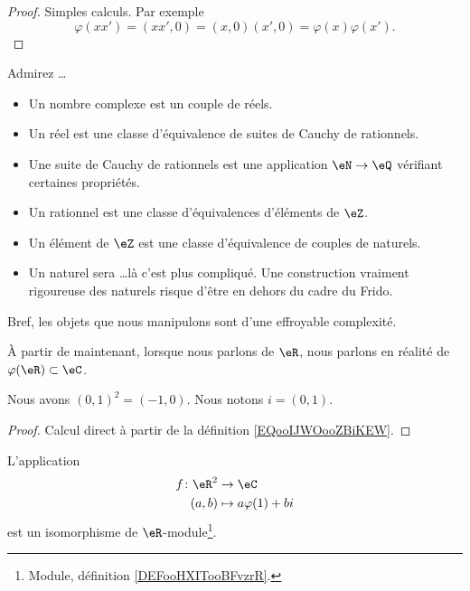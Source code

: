 \begin{proof}
	Simples calculs. Par exemple
	\begin{equation}
		\varphi(xx')=(xx',0)=(x,0)(x',0)=\varphi(x)\varphi(x').
	\end{equation}
\end{proof}

\begin{normaltext}
	Admirez \ldots
	\begin{itemize}
		\item Un nombre complexe est un couple de réels.
		\item Un réel est une classe d'équivalence de suites de Cauchy de rationnels.
		\item Une suite de Cauchy de rationnels est une application \( \eN\to \eQ\) vérifiant certaines propriétés.
		\item Un rationnel est une classe d'équivalences d'éléments de \( \eZ\).
		\item Un élément de \( \eZ\) est une classe d'équivalence de couples de naturels.
		\item Un naturel sera \ldots là c'est plus compliqué. Une construction vraiment rigoureuse des naturels risque d'être en dehors du cadre du Frido.
	\end{itemize}
	Bref, les objets que nous manipulons sont d'une effroyable complexité.
\end{normaltext}

\begin{normaltext}
	À partir de maintenant, lorsque nous parlons de \( \eR\), nous parlons en réalité de \( \varphi(\eR)\subset \eC\).
\end{normaltext}

\begin{lemma}
	Nous avons \( (0,1)^2=(-1,0)\). Nous notons \( i=(0,1)\).
\end{lemma}

\begin{proof}
	Calcul direct à partir de la définition \ref{EQooIJWOooZBiKEW}.
\end{proof}

\begin{proposition}     \label{PROPooKQHLooMFxNLe}
	L'application
	\begin{equation}
		\begin{aligned}
			f\colon \eR^2 & \to \eC                \\
			(a,b)         & \mapsto a\varphi(1)+bi
		\end{aligned}
	\end{equation}
	est un isomorphisme de \( \eR\)-module\footnote{Module, définition \ref{DEFooHXITooBFvzrR}.}.
\end{proposition}


